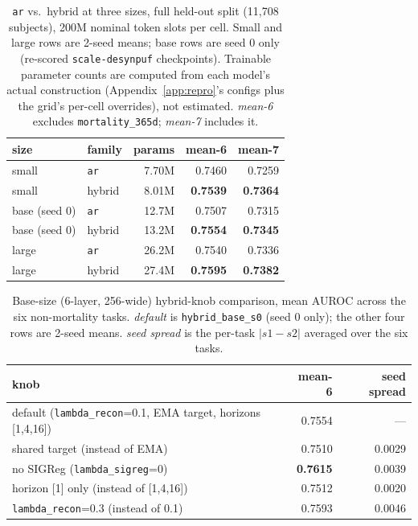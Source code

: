 \documentclass[11pt,a4paper]{article}
\newcommand{\code}[1]{\texttt{\small #1}}
\newcommand{\best}[1]{\textbf{#1}}
\begin{document}
\begin{table}[t]
\centering\footnotesize
\caption{\code{ar} vs.\ hybrid at three sizes, full held-out split (11{,}708
subjects), 200M nominal token slots per cell. Small and large rows are 2-seed
means; base rows are seed 0 only (re-scored \code{scale-desynpuf}
checkpoints). Trainable parameter counts are computed from each model's
actual construction (Appendix~\ref{app:repro}'s configs plus the grid's
per-cell overrides), not estimated. \emph{mean-6} excludes
\code{mortality\_365d}; \emph{mean-7} includes it.}
\label{tab:ablate2size}
\begin{tabular}{llr rr}
\toprule
size & family & params & mean-6 & mean-7 \\
\midrule
small & \code{ar}     & 7.70M & 0.7460 & 0.7259 \ & hybrid         & 8.01M & \best{0.7539} & \best{0.7364} \\
base (seed 0) & \code{ar}   & 12.7M & 0.7507 & 0.7315 \\
base (seed 0) & hybrid       & 13.2M & \best{0.7554} & \best{0.7345} \\
large & \code{ar}     & 26.2M & 0.7540 & 0.7336 \\
large & hybrid         & 27.4M & \best{0.7595} & \best{0.7382} \\
\bottomrule
\end{tabular}
\end{table}

\begin{table}[t]
\centering\footnotesize
\caption{Base-size (6-layer, 256-wide) hybrid-knob comparison, mean AUROC
across the six non-mortality tasks. \emph{default} is \code{hybrid\_base\_s0}
(seed 0 only); the other four rows are 2-seed means. \emph{seed spread} is the
per-task $|s1 - s2|$ averaged over the six tasks.}
\label{tab:ablate2knobs}
\begin{tabular}{lrr}
\toprule
knob & mean-6 & seed spread \\
\midrule
default (\code{lambda\_recon}=0.1, EMA target, horizons [1,4,16]) & 0.7554 & --- \\
shared target (instead of EMA) & 0.7510 & 0.0029 \\
no SIGReg (\code{lambda\_sigreg}=0) & \best{0.7615} & 0.0039 \\
horizon [1] only (instead of [1,4,16]) & 0.7512 & 0.0020 \\
\code{lambda\_recon}=0.3 (instead of 0.1) & 0.7593 & 0.0046 \\
\bottomrule
\end{tabular}
\end{table}
\end{document}

